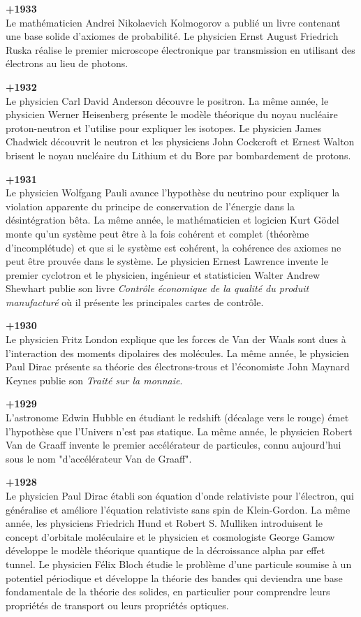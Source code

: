 \textbf{+1933}\\
Le mathématicien Andrei Nikolaevich Kolmogorov a publié un livre contenant une base solide d'axiomes de probabilité. Le physicien Ernst August Friedrich Ruska réalise le premier microscope électronique par transmission en utilisant des électrons au lieu de photons.

\textbf{+1932}\\
Le physicien Carl David Anderson découvre le positron. La même année, le physicien Werner Heisenberg présente le modèle théorique du noyau nucléaire proton-neutron et l'utilise pour expliquer les isotopes. Le physicien James Chadwick découvrit le neutron et les physiciens John Cockcroft et Ernest Walton brisent le noyau nucléaire du Lithium et du Bore par bombardement de protons.

\textbf{+1931}\\
Le physicien Wolfgang Pauli avance l'hypothèse du neutrino pour expliquer la violation apparente du principe de conservation de l'énergie dans la désintégration bêta. La même année, le mathématicien et logicien Kurt Gödel monte qu'un système peut être à la fois cohérent et complet (théorème d'incomplétude) et que si le système est cohérent, la cohérence des axiomes ne peut être prouvée dans le système. Le physicien Ernest Lawrence invente le premier cyclotron et le physicien, ingénieur et statisticien Walter Andrew Shewhart publie son livre \textit{Contrôle économique de la qualité du produit manufacturé} où il présente les principales cartes de contrôle.

\textbf{+1930}\\
Le physicien Fritz London explique que les forces de Van der Waals sont dues à l'interaction des moments dipolaires des molécules. La même année, le physicien Paul Dirac présente sa théorie des électrons-trous et l'économiste John Maynard Keynes publie son \textit{Traité sur la monnaie}.

\textbf{+1929}\\
L'astronome Edwin Hubble en étudiant le redshift (décalage vers le rouge) émet l'hypothèse que l'Univers n'est pas statique. La même année, le physicien Robert Van de Graaff invente le premier accélérateur de particules, connu aujourd'hui sous le nom "d'accélérateur Van de Graaff".

\textbf{+1928}\\
Le physicien Paul Dirac établi son équation d'onde relativiste pour l'électron, qui généralise et améliore l'équation relativiste sans spin de Klein-Gordon. La même année, les physiciens Friedrich Hund et Robert S. Mulliken introduisent le concept d'orbitale moléculaire et le physicien et cosmologiste George Gamow développe le modèle théorique quantique de la décroissance alpha  par effet tunnel. Le physicien Félix Bloch étudie le problème d'une particule soumise à un potentiel périodique et développe la théorie des bandes qui deviendra une base fondamentale de la théorie des solides, en particulier pour comprendre leurs propriétés de transport ou leurs propriétés optiques.

